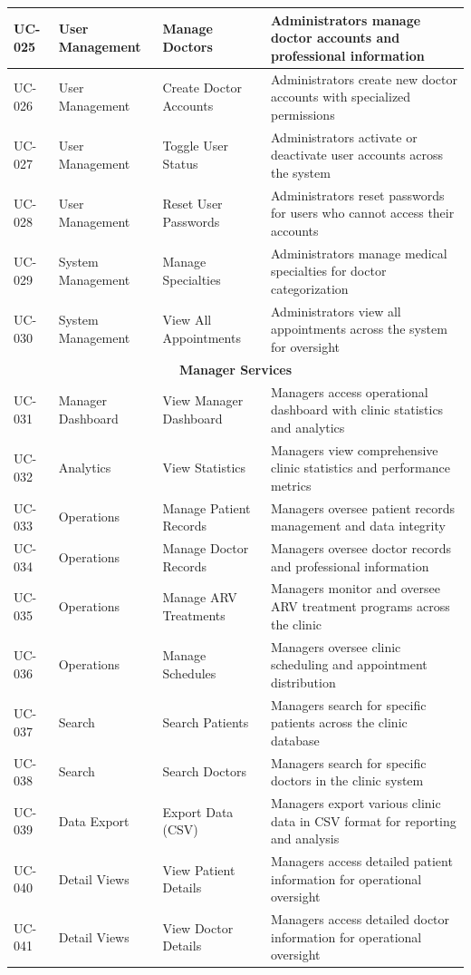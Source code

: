 \documentclass[12pt,a4paper]{article}
\begin{document}
\begin{longtable}{|p{1cm}|p{3cm}|p{3cm}|p{7cm}|}
\hline
UC-025 & User Management & Manage Doctors & Administrators manage doctor accounts and professional information \\
\hline
UC-026 & User Management & Create Doctor Accounts & Administrators create new doctor accounts with specialized permissions \\
\hline
UC-027 & User Management & Toggle User Status & Administrators activate or deactivate user accounts across the system \\
\hline
UC-028 & User Management & Reset User Passwords & Administrators reset passwords for users who cannot access their accounts \\
\hline
UC-029 & System Management & Manage Specialties & Administrators manage medical specialties for doctor categorization \\
\hline
UC-030 & System Management & View All Appointments & Administrators view all appointments across the system for oversight \\
\hline
\multicolumn{4}{|c|}{\textbf{Manager Services}} \\
\hline
UC-031 & Manager Dashboard & View Manager Dashboard & Managers access operational dashboard with clinic statistics and analytics \\
\hline
UC-032 & Analytics & View Statistics & Managers view comprehensive clinic statistics and performance metrics \\
\hline
UC-033 & Operations & Manage Patient Records & Managers oversee patient records management and data integrity \\
\hline
UC-034 & Operations & Manage Doctor Records & Managers oversee doctor records and professional information \\
\hline
UC-035 & Operations & Manage ARV Treatments & Managers monitor and oversee ARV treatment programs across the clinic \\
\hline
UC-036 & Operations & Manage Schedules & Managers oversee clinic scheduling and appointment distribution \\
\hline
UC-037 & Search & Search Patients & Managers search for specific patients across the clinic database \\
\hline
UC-038 & Search & Search Doctors & Managers search for specific doctors in the clinic system \\
\hline
UC-039 & Data Export & Export Data (CSV) & Managers export various clinic data in CSV format for reporting and analysis \\
\hline
UC-040 & Detail Views & View Patient Details & Managers access detailed patient information for operational oversight \\
\hline
UC-041 & Detail Views & View Doctor Details & Managers access detailed doctor information for operational oversight \\
\hline
\end{longtable}
\end{document}
